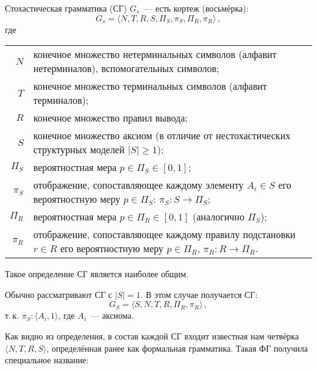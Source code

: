 \begin{defin}
  Стохастическая грамматика (СГ) $G_s$~--- есть кортеж (восьмёрка):
  \begin{equation}
    \label{eq:Gs_general}
    G_s = \langle N, T, R, S, \Pi_S, \pi_S, \Pi_R, \pi_R \rangle\,,
  \end{equation}
  где\begin{tabular}[t]{r@{\;---\;}p{}@{}}
    $N$ & конечное множество нетерминальных символов (алфавит
    нетерминалов), вспомогательных символов;\\
    
    $T$ & конечное множество терминальных символов (алфавит
    терминалов);\\
    
    $R$ & конечное множество правил вывода;\\
    
    $S$ & конечное множество аксиом (в отличие от нестохастических
    структурных моделей $|S| \geqslant 1$);\\
    
    $\Pi_S$ & вероятностная мера $p \in \Pi_S \in [0,1]$;\\
    
    $\pi_S$ & отображение, сопоставляющее каждому элементу $A_i \in S$
    его вероятностную меру $p \in \Pi_S$: $\pi_S \colon S \to \Pi_S$;\\
    
    $\Pi_R$ & вероятностная мера $p \in \Pi_R \in [0,1]$ (аналогично
    $\Pi_S$);\\
    
    $\pi_R$ & отображение, сопоставляющее каждому правилу подстановки
    $r \in R$ его вероятностную меру $p \in \Pi_R$, $\pi_R \colon R \to
    \Pi_R$.\\
  \end{tabular}
\end{defin}

Такое определение СГ является наиболее общим.

\begin{rem}
  Обычно рассматривают СГ с $|S| = 1$. В этом случае получается СГ:
  \begin{equation}
    \label{eq:Gs}
    G_S = \langle S, N, T, R, \Pi_R, \pi_R \rangle\,,
  \end{equation}
  т.\,к. $\pi_S \colon \langle A_i, 1 \rangle$, где $A_i$~--- аксиома.
\end{rem}

Как видно из определения, в состав каждой СГ входит известная нам
четвёрка $\langle N, T, R, S \rangle$, определённая ранее как
формальная грамматика. Такая ФГ получила специальное название:

